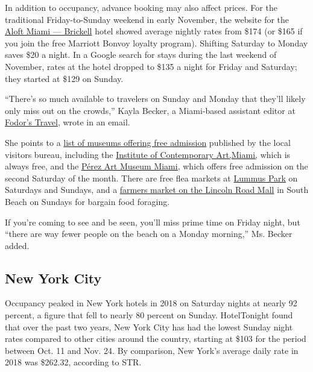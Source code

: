 In addition to occupancy, advance booking may also affect prices. For
the traditional Friday-to-Sunday weekend in early November, the website
for the
\href{https://www.marriott.com/hotels/travel/miaba-aloft-miami-brickell/?scid=bb1a189a-fec3-4d19-a255-54ba596febe2}{Aloft
Miami --- Brickell} hotel showed average nightly rates from \$174 (or
\$165 if you join the free Marriott Bonvoy loyalty program). Shifting
Saturday to Monday saves \$20 a night. In a Google search for stays
during the last weekend of November, rates at the hotel dropped to \$135
a night for Friday and Saturday; they started at \$129 on Sunday.

``There's so much available to travelers on Sunday and Monday that
they'll likely only miss out on the crowds,'' Kayla Becker, a
Miami-based assistant editor at \href{http://www.fodors.com/}{Fodor's
Travel}, wrote in an email.

She points to a
\href{https://www.miamiandbeaches.com/things-to-do/arts-culture/free-museum-days}{list
of museums offering free admission} published by the local visitors
bureau, including the \href{https://icamiami.org/}{Institute of
Contemporary Art,}\href{https://icamiami.org/}{Miami,} which is always
free, and the \href{https://pamm.org/}{Pérez Art Museum Miami,} which
offers free admission on the second Saturday of the month. There are
free flea markets at \href{https://metroflea.miami/}{Lummus Park} on
Saturdays and Sundays, and a
\href{https://lincolnroadmall.com/lincoln-road-farmers-market-takes-place-every-sunday/}{farmers
market on the Lincoln Road Mall} in South Beach on Sundays for bargain
food foraging.

If you're coming to see and be seen, you'll miss prime time on Friday
night, but ``there are way fewer people on the beach on a Monday
morning,'' Ms. Becker added.

\hypertarget{new-york-city}{%
\subsection{New York City}\label{new-york-city}}

Occupancy peaked in New York hotels in 2018 on Saturday nights at nearly
92 percent, a figure that fell to nearly 80 percent on Sunday.
HotelTonight found that over the past two years, New York City has had
the lowest Sunday night rates compared to other cities around the
country, starting at \$103 for the period between Oct. 11 and Nov. 24.
By comparison, New York's average daily rate in 2018 was \$262.32,
according to STR.

